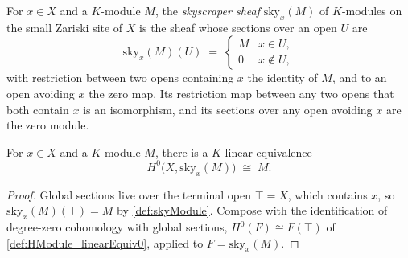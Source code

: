 \begin{definition}
  \label{def:skyModule}
  \leanok
  For \(x \in X\) and a \(K\)-module \(M\), the \emph{skyscraper sheaf} \(\mathrm{sky}_x(M)\) of
  \(K\)-modules on the small Zariski site of \(X\) is the sheaf whose sections over an open
  \(U\) are
  \[
    \mathrm{sky}_x(M)(U) \;=\;
      \begin{cases} M & x \in U, \\ 0 & x \notin U, \end{cases}
  \]
  with restriction between two opens containing \(x\) the identity of \(M\), and to an open
  avoiding \(x\) the zero map. Its restriction map between any two opens that both contain \(x\)
  is an isomorphism, and its sections over any open avoiding \(x\) are the zero module.
\end{definition}

\begin{definition}
  \label{def:skyModuleGammaEquiv}
  \leanok
  For \(x \in X\) and a \(K\)-module \(M\), there is a \(K\)-linear equivalence
  \[
    H^0\bigl(X, \mathrm{sky}_x(M)\bigr) \;\cong\; M .
  \]
\end{definition}
\begin{proof}
  \leanok
  Global sections live over the terminal open \(\top = X\), which contains \(x\), so
  \(\mathrm{sky}_x(M)(\top) = M\) by \ref{def:skyModule}. Compose with the identification of
  degree-zero cohomology with global sections, \(H^0(F) \cong F(\top)\) of
  \ref{def:HModule_linearEquiv0}, applied to \(F = \mathrm{sky}_x(M)\).
\end{proof}

